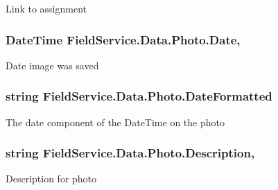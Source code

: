 Link to assignment 

\hypertarget{class_field_service_1_1_data_1_1_photo_a2f0b36e2a1b4829bf033140310fdc99d}{
\subsubsection[{Date}]{\setlength{\rightskip}{0pt plus 5cm}Date\+Time Field\+Service.\+Data.\+Photo.\+Date\hspace{0.3cm}{\ttfamily [get]}, {\ttfamily [set]}}}\label{class_field_service_1_1_data_1_1_photo_a2f0b36e2a1b4829bf033140310fdc99d}


Date image was saved 

\hypertarget{class_field_service_1_1_data_1_1_photo_a97cb9c2da7a4d61a65647fd14a9fa9c7}{
\subsubsection[{Date\+Formatted}]{\setlength{\rightskip}{0pt plus 5cm}string Field\+Service.\+Data.\+Photo.\+Date\+Formatted\hspace{0.3cm}{\ttfamily [get]}}}\label{class_field_service_1_1_data_1_1_photo_a97cb9c2da7a4d61a65647fd14a9fa9c7}


The date component of the Date\+Time on the photo 

\hypertarget{class_field_service_1_1_data_1_1_photo_ab6f347068da6747beee125bd1e47c9aa}{
\subsubsection[{Description}]{\setlength{\rightskip}{0pt plus 5cm}string Field\+Service.\+Data.\+Photo.\+Description\hspace{0.3cm}{\ttfamily [get]}, {\ttfamily [set]}}}\label{class_field_service_1_1_data_1_1_photo_ab6f347068da6747beee125bd1e47c9aa}


Description for photo 


